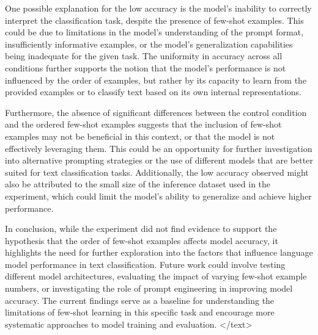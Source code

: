 \documentclass{article}
\begin{document}
One possible explanation for the low accuracy is the model's inability to correctly interpret the classification task, despite the presence of few-shot examples. This could be due to limitations in the model's understanding of the prompt format, insufficiently informative examples, or the model's generalization capabilities being inadequate for the given task. The uniformity in accuracy across all conditions further supports the notion that the model's performance is not influenced by the order of examples, but rather by its capacity to learn from the provided examples or to classify text based on its own internal representations.

Furthermore, the absence of significant differences between the control condition and the ordered few-shot examples suggests that the inclusion of few-shot examples may not be beneficial in this context, or that the model is not effectively leveraging them. This could be an opportunity for further investigation into alternative prompting strategies or the use of different models that are better suited for text classification tasks. Additionally, the low accuracy observed might also be attributed to the small size of the inference dataset used in the experiment, which could limit the model's ability to generalize and achieve higher performance.

In conclusion, while the experiment did not find evidence to support the hypothesis that the order of few-shot examples affects model accuracy, it highlights the need for further exploration into the factors that influence language model performance in text classification. Future work could involve testing different model architectures, evaluating the impact of varying few-shot example numbers, or investigating the role of prompt engineering in improving model accuracy. The current findings serve as a baseline for understanding the limitations of few-shot learning in this specific task and encourage more systematic approaches to model training and evaluation.
</text>
\end{document}
